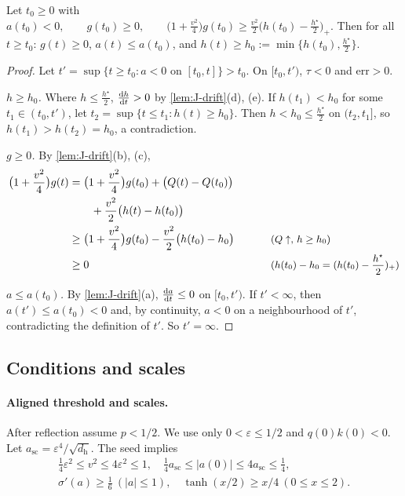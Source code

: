 \begin{lemma}
\label{lem:J-align}
Let $t_0\ge0$ with
 $a(t_0)<0,\qquad g(t_0)\ge0,\qquad \bigl(1+\tfrac{v^2}{4}\bigr)g(t_0)\ge\tfrac{v^2}{2}\bigl(h(t_0)-\tfrac{h^\star}{2}\bigr)_+ .$ 
Then for all $t\ge t_0$: $g(t)\ge0$, $a(t)\le a(t_0)$, and $h(t)\ge h_0:=\min\{h(t_0),\frac{h^\star}{2}\}$.
\end{lemma}

\begin{proof}
Let $t'=\sup\{t\ge t_0:a<0\text{ on }[t_0,t]\}>t_0$. On $[t_0,t')$, $\tau<0$ and $\mathrm{err}>0$.

\emph{$h\ge h_0$.} Where $h\le\frac{h^\star}{2}$, $\ddt{h}>0$ by \cref{lem:J-drift}(d), (e). If $h(t_1)<h_0$ for some $t_1\in(t_0,t')$, let
$t_2=\sup\{t\le t_1:h(t)\ge h_0\}$. Then $h<h_0\le\frac{h^\star}{2}$ on $(t_2,t_1]$, so $h(t_1)>h(t_2)=h_0$, a contradiction.

\emph{$g\ge0$.} By \cref{lem:J-drift}(b), (c),
\begin{alignat*}{2}
 \bigl(1+\tfrac{v^2}{4}\bigr)g(t)&=\bigl(1+\tfrac{v^2}{4}\bigr)g(t_0)+\bigl(Q(t)-Q(t_0)\bigr) &\qquad&\\
 &\qquad+\tfrac{v^2}{2}\bigl(h(t)-h(t_0)\bigr)\\
 &\ge\bigl(1+\tfrac{v^2}{4}\bigr)g(t_0)-\tfrac{v^2}{2}\bigl(h(t_0)-h_0\bigr) && \why{$Q\uparrow$, $h\ge h_0$}\\
 &\ge0 && \why{$h(t_0)-h_0=(h(t_0)-\tfrac{h^\star}{2})_+$}
\end{alignat*}

\emph{$a\le a(t_0)$.} By \cref{lem:J-drift}(a), $\ddt{a}\le0$ on $[t_0,t')$. If $t'<\infty$, then $a(t')\le a(t_0)<0$ and, by continuity, $a<0$ on a
neighbourhood of $t'$, contradicting the definition of $t'$. So $t'=\infty$.
\end{proof}

\subsection{Conditions and scales}

\paragraph{Aligned threshold and scales.}\label{app:J-constants}
After reflection assume $p<1/2$. We use only $0<\varepsilon\le1/2$ and $q(0)k(0)<0$.
Let $a_{\mathrm{sc}}=\varepsilon^4/\sqrt{d_{\mathrm h}}$. The seed implies
\begin{equation}\label{eq:J-scales}
\begin{gathered}\tfrac14\varepsilon^2\le v^2\le4\varepsilon^2\le1,\quad
\tfrac14 a_{\mathrm{sc}}\le|a(0)|\le4a_{\mathrm{sc}}\le\tfrac14,\\
\sigma'(a)\ge\tfrac16\ (|a|\le1),\quad
\tanh(x/2)\ge x/4\ (0\le x\le2).\end{gathered}
\end{equation}

